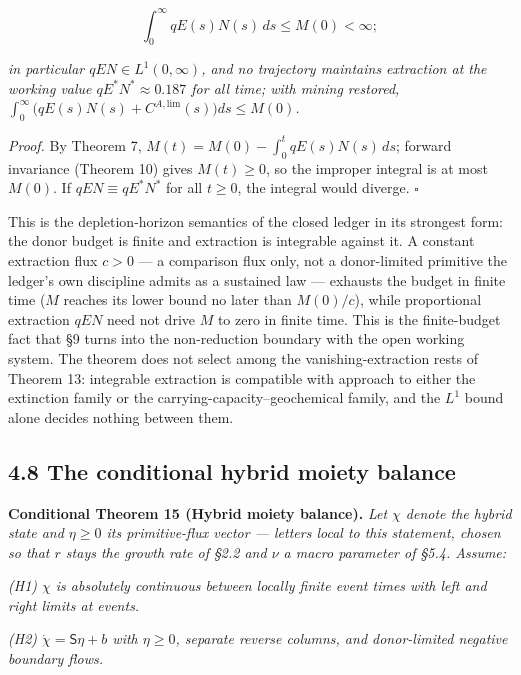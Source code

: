 \documentclass[11pt]{article}
\begin{document}
$$\int_0^\infty qE(s)N(s)\, ds \le M(0) < \infty;$$

 \emph{in particular \(qEN \in L^1(0,\infty)\), and no trajectory maintains extraction at the working value \(qE^*N^* \approx 0.187\) for all time; with mining restored, \(\int_0^\infty \bigl( qE(s)N(s) +\allowbreak{} C^{A,\allowbreak{}\mathrm{lim}}(s) \bigr) ds \le M(0)\).}

\emph{Proof.} By Theorem 7, \(M(t) =\allowbreak{} M(0) - \int_0^t qE(s)N(s)\,\allowbreak{} ds\); forward invariance (Theorem 10) gives \(M(t) \ge 0\), so the improper integral is at most \(M(0)\). If \(qEN \equiv qE^*N^*\) for all \(t \ge 0\), the integral would diverge. \(\square\)

This is the depletion-horizon semantics of the closed ledger in its strongest form: the donor budget is finite and extraction is integrable against it. A constant extraction flux \(c>0\) --- a comparison flux only, not a donor-limited primitive the ledger's own discipline admits as a sustained law --- exhausts the budget in finite time (\(M\) reaches its lower bound no later than \(M(0)/c\)), while proportional extraction \(qEN\) need not drive \(M\) to zero in finite time. This is the finite-budget fact that \S9 turns into the non-reduction boundary with the open working system. The theorem does not select among the vanishing-extraction rests of Theorem 13: integrable extraction is compatible with approach to either the extinction family or the carrying-capacity--geochemical family, and the \(L^1\) bound alone decides nothing between them.

\subsection*{4.8 The conditional hybrid moiety balance}\label{48-the-conditional-hybrid-moiety-balance}

\textbf{Conditional Theorem 15 (Hybrid moiety balance).} \emph{Let \(\chi\) denote the hybrid state and \(\eta\ge0\) its primitive-flux vector --- letters local to this statement, chosen so that \(r\) stays the growth rate of \S2.2 and \(\nu\) a macro parameter of \S5.4. Assume:}

\emph{(H1) \(\chi\) is absolutely continuous between locally finite event times with left and right limits at events.}

\emph{(H2) \(\dot \chi =\allowbreak{} \mathsf{S}\eta +\allowbreak{} b\) with \(\eta \ge 0\), separate reverse columns, and donor-limited negative boundary flows.}
\end{document}
